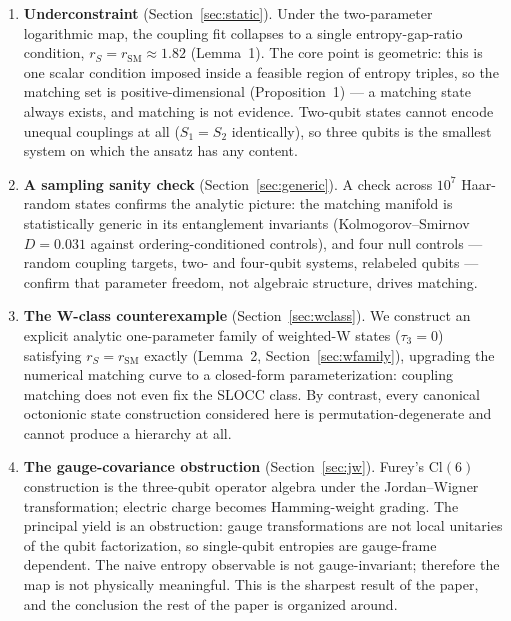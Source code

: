 \documentclass[11pt]{article}
\newcommand{\rSM}{r_{\mathrm{SM}}}
\begin{document}
\begin{enumerate}

\item \textbf{Underconstraint} (Section~\ref{sec:static}). Under the two-parameter logarithmic map, the coupling fit collapses to a single entropy-gap-ratio condition, $r_S = \rSM \approx 1.82$ (Lemma~1). The core point is geometric: this is one scalar condition imposed inside a feasible region of entropy triples, so the matching set is positive-dimensional (Proposition~1) --- a matching state always exists, and matching is not evidence. Two-qubit states cannot encode unequal couplings at all ($S_1 = S_2$ identically), so three qubits is the smallest system on which the ansatz has any content.

\item \textbf{A sampling sanity check} (Section~\ref{sec:generic}). A check across $10^7$ Haar-random states confirms the analytic picture: the matching manifold is statistically generic in its entanglement invariants (Kolmogorov--Smirnov $D = 0.031$ against ordering-conditioned controls), and four null controls --- random coupling targets, two- and four-qubit systems, relabeled qubits --- confirm that parameter freedom, not algebraic structure, drives matching.

\item \textbf{The W-class counterexample} (Section~\ref{sec:wclass}). We construct an explicit analytic one-parameter family of weighted-W states ($\tau_3 = 0$) satisfying $r_S = \rSM$ exactly (Lemma~2, Section~\ref{sec:wfamily}), upgrading the numerical matching curve to a closed-form parameterization: coupling matching does not even fix the SLOCC class. By contrast, every canonical octonionic state construction considered here is permutation-degenerate and cannot produce a hierarchy at all.

\item \textbf{The gauge-covariance obstruction} (Section~\ref{sec:jw}). Furey's $\mathrm{Cl}(6)$ construction is the three-qubit operator algebra under the Jordan--Wigner transformation; electric charge becomes Hamming-weight grading. The principal yield is an obstruction: gauge transformations are not local unitaries of the qubit factorization, so single-qubit entropies are gauge-frame dependent. The naive entropy observable is not gauge-invariant; therefore the map is not physically meaningful. This is the sharpest result of the paper, and the conclusion the rest of the paper is organized around.


\end{enumerate}
\end{document}
